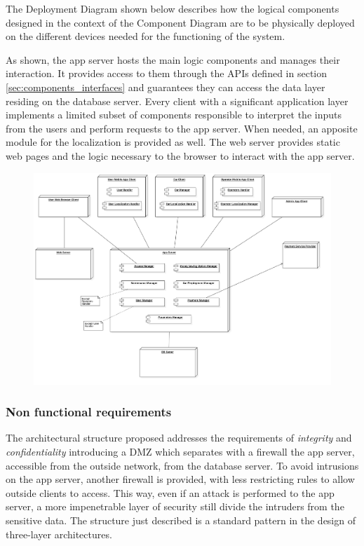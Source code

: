 The Deployment Diagram shown below describes how the logical components designed in the context of the Component Diagram are to be physically deployed on the different devices needed for the functioning of the system.

As shown, the app server hosts the main logic components and manages their interaction. It provides access to them through the APIs defined in section \autoref{sec:components_interfaces} and guarantees they can access the data layer residing on the database server.
Every client with a significant application layer implements a limited subset of components responsible to interpret the inputs from the users and perform requests to the app server. When needed, an apposite module for the localization is provided as well.
The web server provides static web pages and the logic necessary to the browser to interact with the app server.

\begin{figure}
	\includegraphics[width=\hsize, center]{img/deployment_diagrams/global.png}
\end{figure}

	\subsubsection{Non functional requirements}
		The architectural structure proposed addresses the requirements of \textit{integrity} and \textit{confidentiality} introducing a DMZ which separates with a firewall the app server, accessible from the outside network, from the database server. To avoid intrusions on the app server, another firewall is provided, with less restricting rules to allow outside clients to access. This way, even if an attack is performed to the app server, a more impenetrable layer of security still divide the intruders from the sensitive data. The structure just described is a standard pattern in the design of three-layer architectures.
		
		
\FloatBarrier

